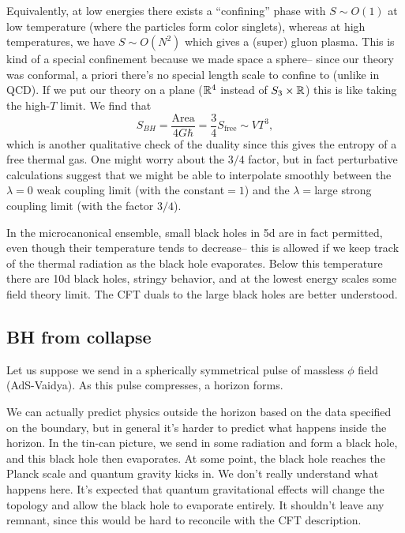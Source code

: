 Equivalently, at low energies there exists a ``confining'' phase with $S\sim O(1)$ at low temperature (where the particles form color singlets), whereas at high temperatures, we have $S\sim O(N^2)$ which gives a (super) gluon plasma. This is kind of a special confinement because we made space a sphere-- since our theory was conformal, a priori there's no special length scale to confine to (unlike in QCD). If we put our theory on a plane ($\mathbb{R}^4$ instead of $S_3\times \mathbb{R}$) this is like taking the high-$T$ limit. We find that
\begin{equation}
    S_{BH}=\frac{\text{Area}}{4G\hbar} =\frac{3}{4} S_\text{free} \sim VT^3,
\end{equation}
which is another qualitative check of the duality since this gives the entropy of a free thermal gas. One might worry about the $3/4$ factor, but in fact perturbative calculations suggest that we might be able to interpolate smoothly between the $\lambda=0$ weak coupling limit (with the constant${}=1$) and the $\lambda={}$large strong coupling limit (with the factor $3/4$).

In the microcanonical ensemble, small black holes in 5d are in fact permitted, even though their temperature tends to decrease-- this is allowed if we keep track of the thermal radiation as the black hole evaporates. Below this temperature there are 10d black holes, stringy behavior, and at the lowest energy scales some field theory limit. The CFT duals to the large black holes are better understood.

\subsection*{BH from collapse}
Let us suppose we send in a spherically symmetrical pulse of massless $\phi$ field (AdS-Vaidya). As this pulse compresses, a horizon forms.

We can actually predict physics outside the horizon based on the data specified on the boundary, but in general it's harder to predict what happens inside the horizon. In the tin-can picture, we send in some radiation and form a black hole, and this black hole then evaporates. At some point, the black hole reaches the Planck scale and quantum gravity kicks in. We don't really understand what happens here. It's expected that quantum gravitational effects will change the topology and allow the black hole to evaporate entirely. It shouldn't leave any remnant, since this would be hard to reconcile with the CFT description.

